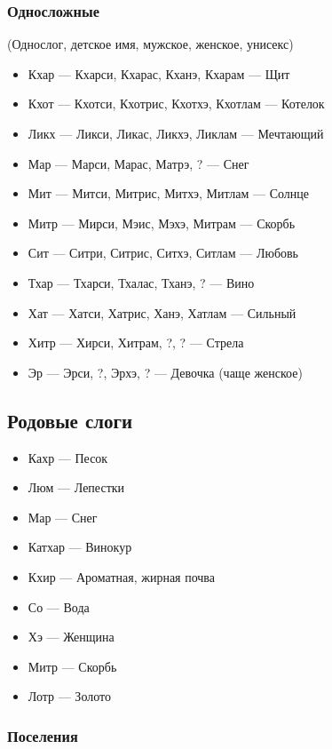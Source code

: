 \documentclass[a4paper,12pt,fleqn]{book}\usepackage{polyglossia}\setdefaultlanguage[babelshorthands=true]{russian}\setotherlanguage{english}\defaultfontfeatures{Ligatures=TeX,Mapping=tex-text}\usepackage{xcolor}\newcommand{\ml}[3]{#2}
\begin{document}
{\subsubsection{Односложные}

(Однослог, детское имя, мужское, женское, унисекс)

\begin{itemize}
\item Кхар --- Кхарси, Кхарас, Кханэ, Кхарам --- Щит
\item Кхот --- Кхотси, Кхотрис, Кхотхэ, Кхотлам --- Котелок
\item Ликх --- Ликси, Ликас, Ликхэ, Ликлам --- Мечтающий
\item Мар --- Марси, Марас, Матрэ, ? --- Снег
\item Мит --- Митси, Митрис, Митхэ, Митлам --- Солнце
\item Митр --- Мирси, Мэис, Мэхэ, Митрам --- Скорбь
\item Сит --- Ситри, Ситрис, Ситхэ, Ситлам --- Любовь
\item Тхар --- Тхарси, Тхалас, Тханэ, ? --- Вино
\item Хат --- Хатси, Хатрис, Ханэ, Хатлам --- Сильный
\item Хитр --- Хирси, Хитрам, ?, ? --- Стрела
\item Эр --- Эрси, ?, Эрхэ, ? --- Девочка (чаще женское)
\end{itemize}

\subsection{Родовые слоги}

\begin{itemize}
\item Кахр --- Песок
\item Люм --- Лепестки
\item Мар --- Снег
\item Катхар --- Винокур
\item Кхир --- Ароматная, жирная почва
\item Со --- Вода
\item Хэ --- Женщина
\item Митр --- Скорбь
\item Лотр --- Золото
\end{itemize}

\subsubsection{Поселения}

}
\end{document}
